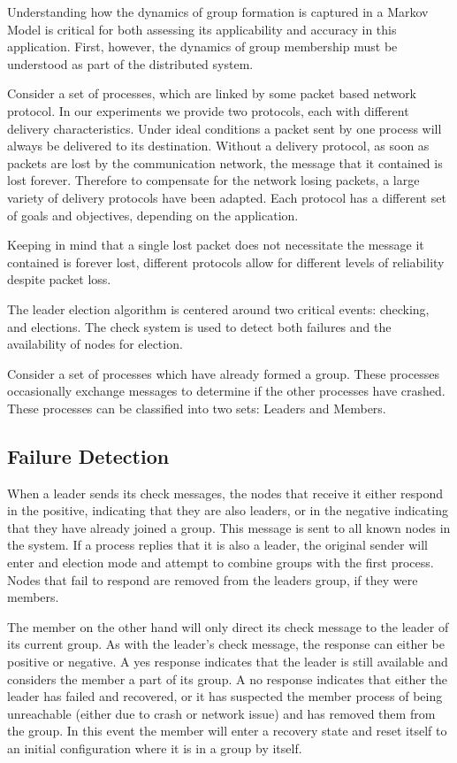 Understanding how the dynamics of group formation is captured in a Markov Model 
is critical for both assessing its applicability and accuracy in this 
application. First, however, the dynamics of group membership must be 
understood as part of the distributed system.

Consider a set of processes, which are linked by some packet based network 
protocol. In our experiments we provide two protocols, each with different 
delivery characteristics. Under ideal conditions a packet sent by one process 
will always be delivered to its destination. Without a delivery protocol, as 
soon as packets are lost by the communication network, the message that it 
contained is lost forever. Therefore to compensate for the network losing 
packets, a large variety of delivery protocols have been adapted. Each protocol 
has a different set of goals and objectives, depending on the application.

Keeping in mind that a single lost packet does not necessitate the message it 
contained is forever lost, different protocols allow for different levels of 
reliability despite packet loss.

The leader election algorithm is centered around two critical events: checking, 
and elections. The check system is used to detect both failures and the 
availability of nodes for election.

Consider a set of processes which have already formed a group. These processes 
occasionally exchange messages to determine if the other processes have 
crashed. These processes can be classified into two sets: Leaders and Members.

\subsection{Failure Detection}

When a leader sends its check messages, the nodes that receive it either 
respond in the positive, indicating that they are also leaders, or in the 
negative indicating that they have already joined a group. This message is sent 
to all known nodes in the system. If a process replies that it is also a 
leader, the original sender will enter and election mode and attempt to combine 
groups with the first process. Nodes that fail to respond are removed from the 
leaders group, if they were members.

The member on the other hand will only direct its check message to the leader 
of its current group. As with the leader's check message, the response can 
either be positive or negative. A yes response indicates that the leader is 
still available and considers the member a part of its group. A no response 
indicates that either the leader has failed and recovered, or it has suspected 
the member process of being unreachable (either due to crash or network issue) 
and has removed them from the group. In this event the member will enter a 
recovery state and reset itself to an initial configuration where it is in a 
group by itself.

